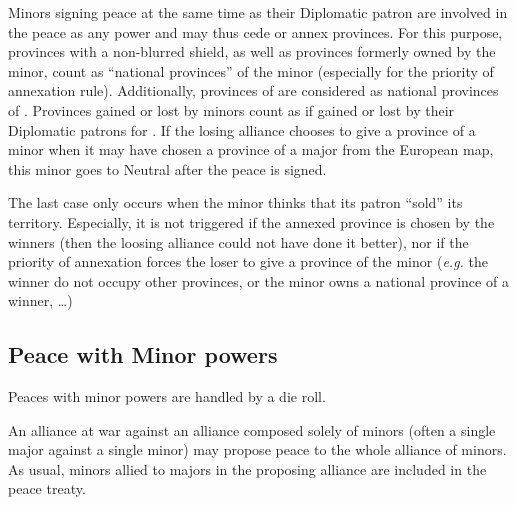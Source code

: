 \bparag Minors signing peace at the same time as their Diplomatic patron are
involved in the peace as any power and may thus cede or annex provinces.
\bparag For this purpose, provinces with a non-blurred shield, as well as
provinces formerly owned by the minor, count as ``national provinces'' of the
minor (especially for the priority of annexation rule).
\bparag Additionally, provinces of \regionBalkans are considered as national
provinces of \paysVenise.
\bparag Provinces gained or lost by minors count as if gained or lost by their
Diplomatic patrons for \VPs.
\bparag If the losing alliance chooses to give a province of a minor when it
may have chosen a province of a major from the European map, this minor goes
to Neutral after the peace is signed.

\begin{designnote}
  The last case only occurs when the minor thinks that its patron ``sold'' its
  territory. Especially, it is not triggered if the annexed province is chosen
  by the winners (then  the loosing alliance could not have done it better),
  nor if the priority of annexation forces the loser to give a province of the
  minor (\emph{e.g.} the winner do not occupy other provinces, or the minor
  owns a national province of a winner, \ldots)
\end{designnote}

\subsection{Peace with Minor powers}\label{chPeace:Peace with Minors}
\aparag Peaces with minor powers are handled by a die roll.

 An alliance at war against an alliance composed solely
of minors (often a single major against a single minor) may propose peace to
the whole alliance of minors.
\bparag As usual, minors allied to majors in the proposing alliance are
included in the peace treaty.

